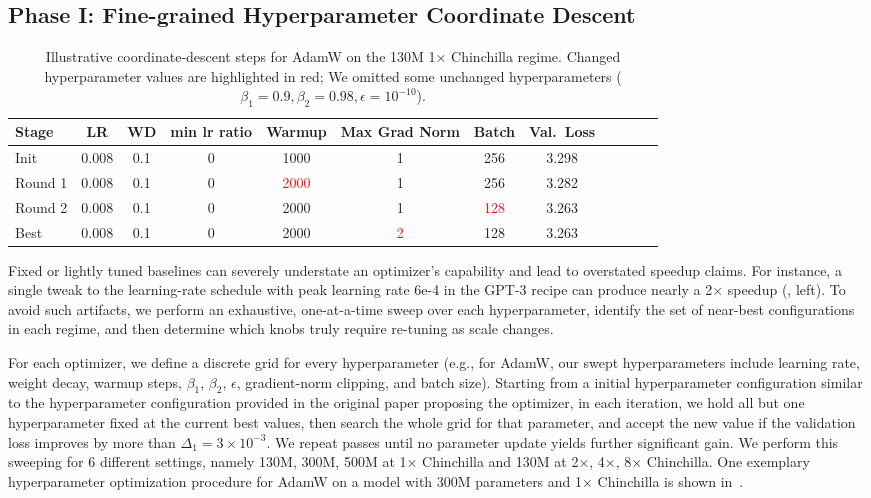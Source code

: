 \subsection{Phase I: Fine-grained Hyperparameter Coordinate Descent}
\label{sec:phase1}

\begin{table}[b]
  \centering
  \begin{tabular}{lccccccccccc}
    \toprule
    \textbf{Stage} & \textbf{LR} & \textbf{WD} & \textbf{min lr ratio} & \textbf{Warmup} & \textbf{Max Grad Norm} & \textbf{Batch} & \textbf{Val.\ Loss} \\
    \midrule
    Init      & 0.008 & 0.1 & 0 & 1000 &  1  & 256 & 3.298 \\
    Round 1   & 0.008 & 0.1 & 0 & \textcolor{red}{2000}  & 1  & 256 & 3.282 \\
    Round 2   & 0.008 & 0.1 & 0 & 2000 & 1 & \textcolor{red}{128} & 3.263 \\
    Best      & 0.008 & 0.1 & 0 & 2000 & \textcolor{red}{2} & 128 & 3.263 \\
    \bottomrule
  \end{tabular}
  \caption{Illustrative coordinate‐descent steps for AdamW on the 130M 1× Chinchilla regime. Changed hyperparameter values are highlighted in red; We omitted some unchanged hyperparameters ($\beta_1 = 0.9,\beta_2 = 0.98 ,\epsilon = 10^{-10}$).}
  \label{tab:adamw-sweep-example-full}
\end{table}
Fixed or lightly tuned baselines can severely understate an optimizer's capability and lead to overstated speedup claims. For instance, a single tweak to the learning-rate schedule with peak learning rate 6e-4 in the GPT-3 recipe \cite{brown2020languagemodelsfewshotlearners} can produce nearly a 2× speedup (, left). 
To avoid such artifacts, we perform an exhaustive, one-at-a-time sweep over each hyperparameter, identify the set of near-best configurations in each regime, and then determine which knobs truly require re-tuning as scale changes.

For each optimizer, we define a discrete grid for every hyperparameter (e.g., for AdamW, our swept hyperparameters include learning rate, weight decay, warmup steps, $\beta_{1}$, $\beta_{2}$, $\epsilon$, gradient-norm clipping, and batch size). Starting from a initial hyperparameter configuration similar to the hyperparameter configuration provided in the original paper proposing the optimizer, in each iteration, we hold all but one hyperparameter fixed at the current best values, then search the whole grid for that parameter, and accept the new value if the validation loss improves by more than $\Delta_1 = 3 \times 10^{-3}$. We repeat passes until no parameter update yields further significant gain. 
We perform this sweeping for 6 different settings, namely 130M, 300M, 500M at 1× Chinchilla and 130M at 2×, 4×, 8× Chinchilla. 
One exemplary  hyperparameter optimization procedure for AdamW on a model with 300M parameters and 1× Chinchilla is shown in~.



